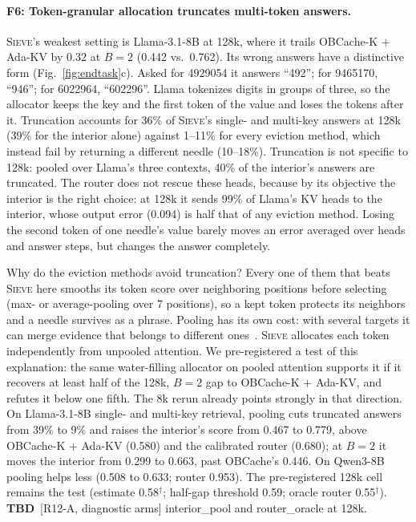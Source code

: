 \documentclass{article}
\newif\ifshowtbd \showtbdtrue
\newcommand{\tbd}[1]{\ifshowtbd{\color{tbdcol}\textbf{TBD}~#1}\else\ifhmode\unskip\fi\fi}
\newcommand{\est}[1]{{\color{estcol}#1$^{\dagger}$}}
\newcommand{\sieve}{\textsc{Sieve}}
\theoremstyle{definition}
\begin{document}
\paragraph{F6: Token-granular allocation truncates multi-token answers.}
\sieve{}'s weakest setting is Llama-3.1-8B at 128k, where it trails OBCache-K + Ada-KV by $0.32$ at $B=2$ (0.442 vs.\ 0.762).  Its wrong answers have a distinctive form (Fig.~\ref{fig:endtask}c).  Asked for 4929054 it answers ``492''; for 9465170, ``946''; for 6022964, ``602296''.  Llama tokenizes digits in groups of three, so the allocator keeps the key and the first token of the value and loses the tokens after it.  Truncation accounts for 36\% of \sieve{}'s single- and multi-key answers at 128k (39\% for the interior alone) against 1--11\% for every eviction method, which instead fail by returning a different needle (10--18\%).  Truncation is not specific to 128k: pooled over Llama's three contexts, 40\% of the interior's answers are truncated.  The router does not rescue these heads, because by its objective the interior is the right choice: at 128k it sends 99\% of Llama's KV heads to the interior, whose output error (0.094) is half that of any eviction method.  Losing the second token of one needle's value barely moves an error averaged over heads and answer steps, but changes the answer completely.

Why do the eviction methods avoid truncation?  Every one of them that beats \sieve{} here smooths its token score over neighboring positions before selecting (max- or average-pooling over 7 positions), so a kept token protects its neighbors and a needle survives as a phrase.  Pooling has its own cost: with several targets it can merge evidence that belongs to different ones~\citep{zhang2026fixedcontract}.  \sieve{} allocates each token independently from unpooled attention.  We pre-registered a test of this explanation: the same water-filling allocator on pooled attention supports it if it recovers at least half of the 128k, $B=2$ gap to OBCache-K + Ada-KV, and refutes it below one fifth.  The 8k rerun already points strongly in that direction.  On Llama-3.1-8B single- and multi-key retrieval, pooling cuts truncated answers from 39\% to 9\% and raises the interior's score from 0.467 to 0.779, above OBCache-K + Ada-KV (0.580) and the calibrated router (0.680); at $B=2$ it moves the interior from 0.299 to 0.663, past OBCache's 0.446.  On Qwen3-8B pooling helps less (0.508 to 0.633; router 0.953).  The pre-registered 128k cell remains the test (estimate \est{0.58}; half-gap threshold 0.59; oracle router \est{0.55}).  \tbd{[R12-A, diagnostic arms] interior\_pool and router\_oracle at 128k.}
\end{document}
